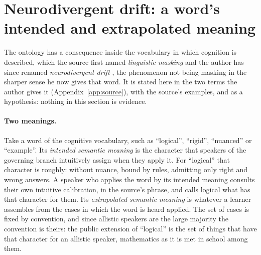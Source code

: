 \section{Neurodivergent drift: a word's intended and extrapolated meaning}
\label{sec:linguistic}

The ontology has a consequence inside the vocabulary in which cognition is described, which the source first named \emph{linguistic masking} and the author has since renamed \emph{neurodivergent drift} \cite{Aethus}, the phenomenon not being masking in the sharper sense he now gives that word. It is stated here in the two terms the author gives it (Appendix~\ref{app:source}), with the source's examples, and as a hypothesis: nothing in this section is evidence.

\paragraph{Two meanings.} Take a word of the cognitive vocabulary, such as ``logical'', ``rigid'', ``nuanced'' or ``example''. Its \emph{intended semantic meaning} is the character that speakers of the governing branch intuitively assign when they apply it. For ``logical'' that character is roughly: without nuance, bound by rules, admitting only right and wrong answers. A speaker who applies the word by its intended meaning consults their own intuitive calibration, in the source's phrase, and calls logical what has that character for them. Its \emph{extrapolated semantic meaning} is whatever a learner assembles from the cases in which the word is heard applied. The set of cases is fixed by convention, and since allistic speakers are the large majority the convention is theirs: the public extension of ``logical'' is the set of things that have that character for an allistic speaker, mathematics as it is met in school among them.

